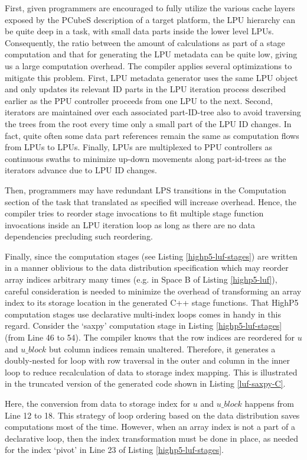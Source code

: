 \documentclass[ASNA,twocolumn]{USG} %
\begin{document}
{First, given programmers are encouraged to fully utilize the various cache layers exposed by the PCubeS description of a target platform, the LPU hierarchy can be quite deep in a task, with small data parts inside the lower level LPUs. Consequently, the ratio between the amount of calculations as part of a stage computation and that for generating the LPU metadata can be quite low, giving us a large computation overhead. The compiler applies several optimizations to mitigate this problem. First, LPU metadata generator uses the same LPU object and only updates its relevant ID parts in the LPU iteration process described earlier as the PPU controller proceeds from one LPU to the next. Second, iterators are maintained over each associated part-ID-tree also to avoid traversing the trees from the root every time only a small part of the LPU ID changes. In fact, quite often some data part references remain the same as computation flows from LPUs to LPUs. Finally, LPUs are multiplexed to PPU controllers as continuous swaths to minimize up-down movements along part-id-trees as the iterators advance due to LPU ID changes.

Then, programmers may have redundant LPS transitions in the Computation section of the task that translated as specified will increase overhead. Hence, the compiler tries to reorder stage invocations to fit multiple stage function invocations inside an LPU iteration loop as long as there are no data dependencies precluding such reordering.

Finally, since the computation stages (see Listing \ref{highp5-luf-stages}) are written in a manner oblivious to the data distribution specification which may reorder array indices arbitrary many times (e.g. in Space B of Listing \ref{highp5-luf}), careful consideration is needed to minimize the overhead of transforming an array index to its storage location in the generated C++ stage functions. 
That HighP5 computation stages use declarative multi-index loops comes in handy in this regard. Consider the `saxpy' computation stage in Listing \ref{highp5-luf-stages} (from Line 46 to 54). The compiler knows that the row indices are reordered for $u$ and $u\_block$ but column indices remain unaltered. Therefore, it generates a doubly-nested for loop with row traversal in the outer and column in the inner loop to reduce recalculation of data to storage index mapping. This is illustrated in the truncated version of the generated code shown in Listing \ref{luf-saxpy-C}.

Here, the conversion from data to storage index for $u$ and $u\_block$ happens from Line 12 to 18. This strategy of loop ordering based on the data distribution saves computations most of the time. However, when an array index is not a part of a declarative loop, then the index transformation must be done in place, as needed for the index `pivot' in Line 23 of Listing \ref{highp5-luf-stages}.   

}
\end{document}
